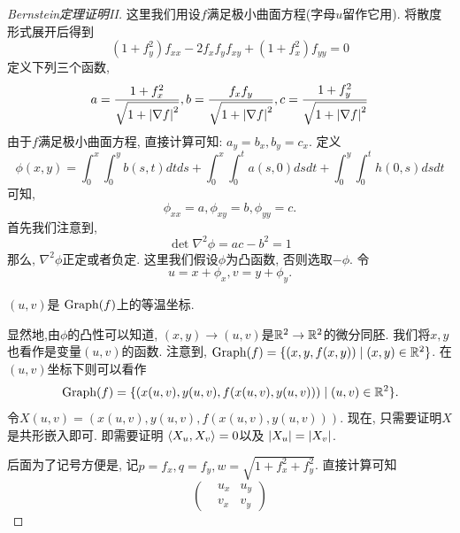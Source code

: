 \begin{proof}[Bernstein定理证明II]
    这里我们用设$f$满足极小曲面方程(字母$u$留作它用). 将散度形式展开后得到
    \begin{equation}
        (1+f_y^2)f_{xx}-2f_xf_yf_{xy}+(1+f_x^2)f_{yy}=0
    \end{equation}
    定义下列三个函数, 
    \begin{equation}
        a=\frac{1+f_x^2}{\sqrt{1+\left | \nabla f \right |^2}},
        b=\frac{f_xf_y}{\sqrt{1+\left | \nabla f \right |^2}},
        c=\frac{1+f_y^2}{\sqrt{1+\left | \nabla f \right |^2}}
    \end{equation}
    由于$f$满足极小曲面方程, 直接计算可知: $a_y=b_x, b_y=c_x$.
    定义
    \begin{equation}
        \phi(x,y)=\int^x_0\int^y_0 b(s,t)dtds+\int^x_0\int^t_0a(s,0)dsdt+\int^y_0\int^t_0h(0,s)dsdt
    \end{equation}
    可知, 
    \begin{equation}
        \phi_{xx}=a, \phi_{xy}=b, \phi_{yy}=c.
    \end{equation}
    首先我们注意到, 
    \begin{equation}
        \det \nabla^2 \phi= ac-b^2 =1
    \end{equation}
    那么,  $\nabla^2 \phi$正定或者负定. 这里我们假设$\phi$为凸函数, 否则选取$-\phi$.  令
    \begin{equation}
        u=x+\phi_x, v=y+\phi_y.
    \end{equation}
    \begin{claim}
        $(u,v)$是 $\text{Graph}(f)$上的等温坐标.
    \end{claim}
    显然地,由$\phi$的凸性可以知道, $(x,y)\to (u,v)$是$\mathbb{R}^2 \to \mathbb{R}^2$的微分同胚.  我们将$x,y$也看作是变量$(u,v)$的函数. 注意到, $\text{Graph}(f)=\{(x,y,f(x,y))\mid (x,y) \in \mathbb{R}^2\}$. 在$(u,v)$坐标下则可以看作
    \begin{equation}
        \text{Graph}(f)=\{(x(u,v), y(u,v), f(x(u,v), y(u,v)))\mid (u,v) \in \mathbb{R}^2\}.
    \end{equation}
    令$X(u,v)= (x(u,v), y(u,v), f(x(u,v), y(u,v)))$. 现在, 只需要证明$X$是共形嵌入即可. 即需要证明 ${\left < X_u, X_v \right >}=0$以及 $\left | X_u \right |=\left | X_v \right |$.
    \par 后面为了记号方便是, 记$p=f_x, q=f_y, w=\sqrt{1+f_x^2+f_y^2}$. 直接计算可知
    \begin{equation}
        \begin{pmatrix}
            &u_x &u_y \\
            &v_x &v_y
        \end{pmatrix}

\end{equation}
\end{proof}
